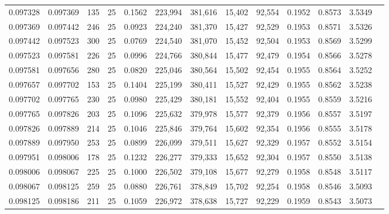 \begin{tabular}{rrrrrrrrrrrrr}
0.097328 & 0.097369 &   135 &  25 &                                     0.1562 & 223,994 & 381,616 &  15,402 &  92,554 & 0.1952 & 0.8573 & 3.5349 \\
0.097369 & 0.097442 &   246 &  25 &                                     0.0923 & 224,240 & 381,370 &  15,427 &  92,529 & 0.1953 & 0.8571 & 3.5326 \\
0.097442 & 0.097523 &   300 &  25 &                                     0.0769 & 224,540 & 381,070 &  15,452 &  92,504 & 0.1953 & 0.8569 & 3.5299 \\
0.097523 & 0.097581 &   226 &  25 &                                     0.0996 & 224,766 & 380,844 &  15,477 &  92,479 & 0.1954 & 0.8566 & 3.5278 \\
0.097581 & 0.097656 &   280 &  25 &                                     0.0820 & 225,046 & 380,564 &  15,502 &  92,454 & 0.1955 & 0.8564 & 3.5252 \\
0.097657 & 0.097702 &   153 &  25 &                                     0.1404 & 225,199 & 380,411 &  15,527 &  92,429 & 0.1955 & 0.8562 & 3.5238 \\
0.097702 & 0.097765 &   230 &  25 &                                     0.0980 & 225,429 & 380,181 &  15,552 &  92,404 & 0.1955 & 0.8559 & 3.5216 \\
0.097765 & 0.097826 &   203 &  25 &                                     0.1096 & 225,632 & 379,978 &  15,577 &  92,379 & 0.1956 & 0.8557 & 3.5197 \\
0.097826 & 0.097889 &   214 &  25 &                                     0.1046 & 225,846 & 379,764 &  15,602 &  92,354 & 0.1956 & 0.8555 & 3.5178 \\
0.097889 & 0.097950 &   253 &  25 &                                     0.0899 & 226,099 & 379,511 &  15,627 &  92,329 & 0.1957 & 0.8552 & 3.5154 \\
0.097951 & 0.098006 &   178 &  25 &                                     0.1232 & 226,277 & 379,333 &  15,652 &  92,304 & 0.1957 & 0.8550 & 3.5138 \\
0.098006 & 0.098067 &   225 &  25 &                                     0.1000 & 226,502 & 379,108 &  15,677 &  92,279 & 0.1958 & 0.8548 & 3.5117 \\
0.098067 & 0.098125 &   259 &  25 &                                     0.0880 & 226,761 & 378,849 &  15,702 &  92,254 & 0.1958 & 0.8546 & 3.5093 \\
0.098125 & 0.098186 &   211 &  25 &                                     0.1059 & 226,972 & 378,638 &  15,727 &  92,229 & 0.1959 & 0.8543 & 3.5073 \\

\end{tabular}
